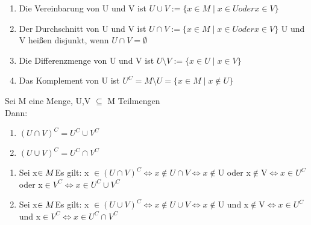 \begin{enumerate}
\item Die Vereinbarung von U und V ist $U \cup V := \{x \in M \mid x \in U oder x \in V\}$
\item Der Durchschnitt von U und V ist $U \cap V := \{x \in M \mid x \in U oder x \in V\}$
U und V heißen disjunkt, wenn $U \cap V = \emptyset$
\item Die Differenzmenge von U und V ist $U \setminus V := \{x \in U \mid x \in V\}$
\item Das Komplement von U ist $U^C = M \setminus U = \{x \in M \mid x {\not\in} U\}$
%
\end{enumerate}
%
Sei M eine Menge, U,V $\subseteq$ M Teilmengen\\
Dann:
\begin{enumerate}
\item $(U \cap V)^C = U^C \cup V^C$
\item $(U \cup V)^C = U^C \cap V^C$
\end{enumerate}
%
\bew
\begin{enumerate}
\item Sei x$ \in M\\$Es gilt: x $\in (U \cap V)^C \Leftrightarrow x {\not\in} U \cap V \Leftrightarrow x {\not\in} $U oder x$ {\not\in} $V$\Leftrightarrow x \in U^C$ oder x$\in V^C \Leftrightarrow x\in U^C \cup V^C$
\item Sei x$ \in M\\$Es gilt: x $\in (U \cup V)^C \Leftrightarrow x {\not\in} U \cup V \Leftrightarrow x {\not\in} $U und x$ {\not\in} $V$\Leftrightarrow x \in U^C$ und x$\in V^C \Leftrightarrow x\in U^C \cap V^C$
\end{enumerate}
%
